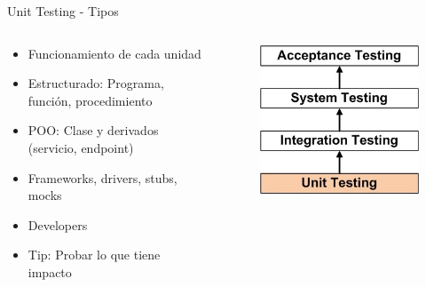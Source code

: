 \documentclass[aspectratio=169]{beamer}
\begin{document}
\begin{frame}{Unit Testing - Tipos}
\begin{columns}[T]
	\begin{column}[T]{6cm}
		\begin{itemize}
			\item Funcionamiento de cada unidad
			\item Estructurado: Programa, función, procedimiento
			\item POO: Clase y derivados (servicio, endpoint)
			\item Frameworks, drivers, stubs, mocks
			\item Developers
			\item Tip: Probar lo que tiene impacto
		\end{itemize}
	\end{column}
	\begin{column}[T]{4cm} %
\begin{figure}
	\centering
	\includegraphics[width=0.8\linewidth]{Images/unittesting}
\end{figure}
	\end{column}
\end{columns}
\end{frame}
\end{document}
